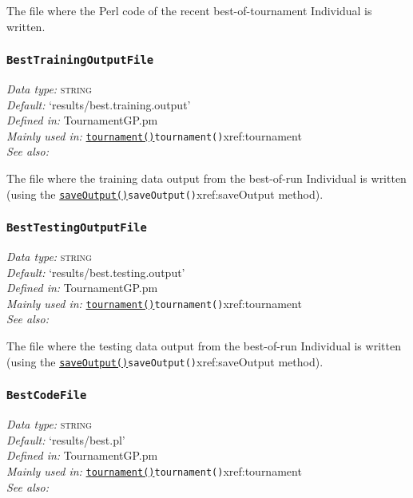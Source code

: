 \documentclass[a4paper]{article}
\begin{document}
The file where the Perl code of the recent best-of-tournament
Individual is written.


\subsubsection{\texttt{BestTrainingOutputFile}}\label{xref:BestTrainingOutputFile}
\begin{flushleft}
\textit{Data type:} \textsc{string}\\
\textit{Default:} `results/best.training.output'\\
\textit{Defined in:} TournamentGP.pm\\
\textit{Mainly used in:} \hyperref[no]{\texttt{tournament()}}{\texttt{tournament()}}{xref:tournament}\\
\textit{See also:}
\end{flushleft}

The file where the training data output from the best-of-run
Individual is written (using the \hyperref[no]{\texttt{saveOutput()}}{\texttt{saveOutput()}}{xref:saveOutput} method).

\subsubsection{\texttt{BestTestingOutputFile}}\label{xref:BestTestingOutputFile}
\begin{flushleft}
\textit{Data type:} \textsc{string}\\
\textit{Default:} `results/best.testing.output'\\
\textit{Defined in:} TournamentGP.pm\\
\textit{Mainly used in:} \hyperref[no]{\texttt{tournament()}}{\texttt{tournament()}}{xref:tournament}\\
\textit{See also:}
\end{flushleft}

The file where the testing data output from the
best-of-run Individual is written (using the
\hyperref[no]{\texttt{saveOutput()}}{\texttt{saveOutput()}}{xref:saveOutput} method).

\subsubsection{\texttt{BestCodeFile}}\label{xref:BestCodeFile}
\begin{flushleft}
\textit{Data type:} \textsc{string}\\
\textit{Default:} `results/best.pl'\\
\textit{Defined in:} TournamentGP.pm\\
\textit{Mainly used in:} \hyperref[no]{\texttt{tournament()}}{\texttt{tournament()}}{xref:tournament}\\
\textit{See also:}
\end{flushleft}
\end{document}
